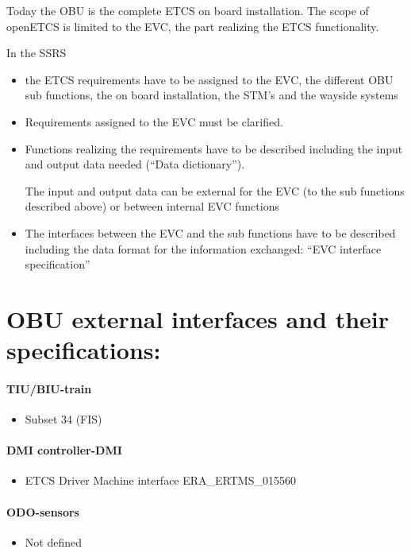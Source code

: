 \documentclass{template/openetcs_article}
\begin{document}
Today the OBU is the complete ETCS on board installation. The scope of openETCS is limited to the EVC, the part realizing the ETCS functionality.

In the SSRS 
\begin{itemize}
\item the ETCS requirements have to be assigned to the EVC, the different OBU sub functions, the on board installation, the STM's and the wayside systems
\item Requirements assigned to the EVC must be clarified.
\item Functions realizing the requirements have to be described including the input and output data needed ({\textquotedblleft}Data dictionary{\textquotedblright}).

The input and output data can be external for the EVC (to the sub functions described above) or between internal EVC functions 
\item The interfaces between the EVC and the sub functions have to be described including the data format for the information exchanged: {\textquotedblleft}EVC interface specification{\textquotedblright}
\end{itemize}


\section{OBU external interfaces and their specifications:}



\paragraph{TIU/BIU-train}
  \begin{itemize}
  \item Subset 34 (FIS)
  \end{itemize}

\paragraph{DMI controller-DMI}
  \begin{itemize}
  \item ETCS Driver Machine interface ERA\_ERTMS\_015560
  \end{itemize}



\paragraph{ODO-sensors}
\begin{itemize}
\item Not defined
\end{itemize}
\end{document}
